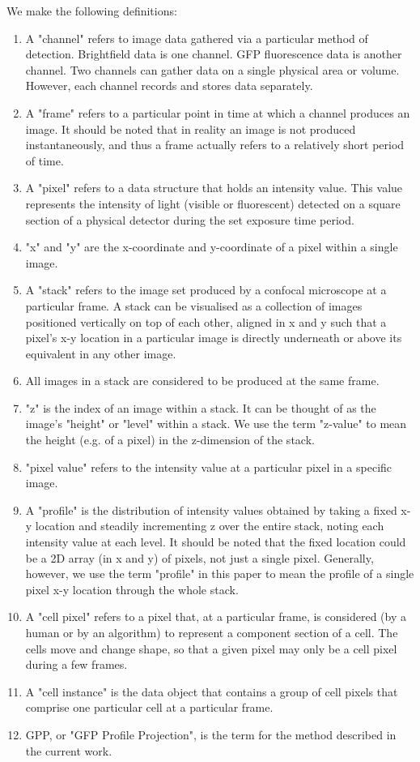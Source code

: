 We make the following definitions:
\begin{enumerate}
\item A "channel" refers to image data gathered via a particular method of detection. Brightfield data is one channel. GFP fluorescence data is another channel. Two channels can gather data on a single physical area or volume. However, each channel records and stores data separately.
\item A "frame" refers to a particular point in time at which a channel produces an image. It should be noted that in reality an image is not produced instantaneously, and thus a frame actually refers to a relatively short period of time.
\item A "pixel" refers to a data structure that holds an intensity value. This value represents the intensity of light (visible or fluorescent) detected on a square section of a physical detector during the set exposure time period.
\item "x" and "y" are the x-coordinate and y-coordinate of a pixel within a single image.
\item A "stack" refers to the image set produced by a confocal microscope at a particular frame. A stack can be visualised as a collection of images positioned vertically on top of each other, aligned in x and y such that a pixel's x-y location in a particular image is directly underneath or above its equivalent in any other image.
\item All images in a stack are considered to be produced at the same frame.
\item "z" is the index of an image within a stack. It can be thought of as the image's "height" or "level" within a stack. We use the term "z-value" to mean the height (e.g. of a pixel) in the z-dimension of the stack.
\item "pixel value" refers to the intensity value at a particular pixel in a specific image.
\item A "profile" is the distribution of intensity values obtained by taking a fixed x-y location and steadily incrementing z over the entire stack, noting each intensity value at each level. It should be noted that the fixed location could be a 2D array (in x and y) of pixels, not just a single pixel. Generally, however, we use the term "profile" in this paper to mean the profile of a single pixel x-y location through the whole stack.
\item A "cell pixel" refers to a pixel that, at a particular frame, is considered (by a human or by an algorithm) to represent a component section of a cell. The cells move and change shape, so that a given pixel may only be a cell pixel during a few frames.
\item A "cell instance" is the data object that contains a group of cell pixels that comprise one particular cell at a particular frame.
\item GPP, or "GFP Profile Projection", is the term for the method described in the current work.
\end{enumerate}

